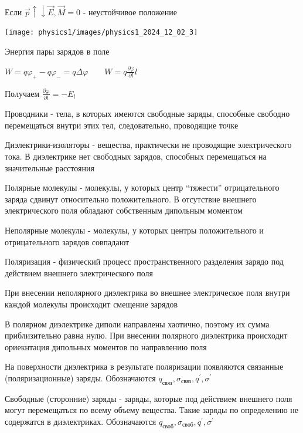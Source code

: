 \documentclass[12pt]{article}
\begin{document}
Если $\vec{p} \uparrow\downarrow \vec{E}, \vec{M} = 0$ - неустойчивое положение

\begin{center}
    \texttt{[image: physics1/images/physics1\_2024\_12\_02\_3]}
\end{center}


Энергия пары зарядов в поле

$W = q \varphi_+ - q\varphi_- = q\Delta\varphi \qquad W = q\frac{\partial \varphi}{\partial l}l$

Получаем $\frac{\partial \varphi}{\partial l} = -E_l$

\Def Проводники - тела, в которых имеются свободные заряды, способные свободно перемещаться внутри этих тел, следовательно,
проводящие точке

\Def Диэлектрики-изоляторы - вещества, практически не проводящие электрического тока. В диэлектрике нет 
свободных зарядов, способных перемещаться на значительные расстояния

\Def Полярные молекулы - молекулы, у которых центр \enquote{тяжести} отрицательного заряда сдвинут относительно положительного. 
В отсутствие внешнего электрического поля обладают собственным дипольным моментом

\Def Неполярные молекулы - молекулы, у которых центры положительного и отрицательного зарядов совпадают

\Def Поляризация - физический процесс пространственного разделения зарядо под действием внешнего электрического поля

При внесении неполярного диэлектрика во внешнее электрическое поля внутри каждой молекулы происходит смещение зарядов

В полярном диэлектрике диполи направлены хаотично, поэтому их сумма приблизительно равна нулю. 
При внесении полярного диэлектрика происходит ориекнтация дипольных моментов по направлению поля

На поверхности диэлектрика в результате поляризации появляются связанные (поляризационные) заряды. Обозначаются 
$q_\text{связ}, \sigma_\text{связ}, q^\prime, \sigma^\prime$

Свободные (сторонние) заряды - заряды, которые под действием внешнего поля могут перемещаться по всему объему 
вещества. Такие заряды по определению не содержатся в диэлектриках. 
Обозначаются $q_\text{своб}, \sigma_\text{своб}, q^\prime, \sigma^\prime$


\end{document}
